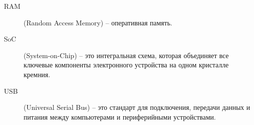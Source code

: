 \begin{description}
	\item[\normalfont RAM] (Random Access Memory) -- оперативная память.
	
	\item[\normalfont SoC] (System-on-Chip) -- это интегральная схема, которая объединяет все ключевые компоненты электронного устройства на одном кристалле кремния.
	
	\item[\normalfont USB] (Universal Serial Bus) -- это стандарт для подключения, передачи данных и питания между компьютерами и периферийными устройствами.
	

\end{description}

\newpage
